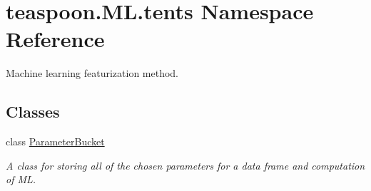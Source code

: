 \hypertarget{namespaceteaspoon_1_1_m_l_1_1tents}{}\section{teaspoon.\+M\+L.\+tents Namespace Reference}
\label{namespaceteaspoon_1_1_m_l_1_1tents}


Machine learning featurization method.  


\subsection*{Classes}
\begin{DoxyCompactItemize}
\item 
class \hyperlink{classteaspoon_1_1_m_l_1_1tents_1_1_parameter_bucket}{Parameter\+Bucket}
\begin{DoxyCompactList}\small\item\em A class for storing all of the chosen parameters for a data frame and computation of ML. \end{DoxyCompactList}\end{DoxyCompactItemize}
